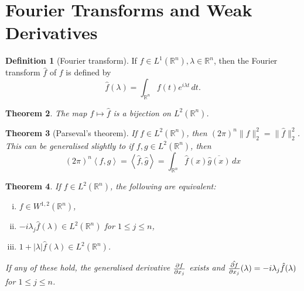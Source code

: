\documentclass[10pt, oneside, reqno]{amsart}
\theoremstyle{plain}%
\newtheorem{thm}{Theorem}[section]
\numberwithin{equation}{section}
\theoremstyle{definition}
\newtheorem{defn}[thm]{Definition}
\theoremstyle{remark}
\newcommand{\R}{\mathbb{R}}
\newcommand{\iprod}[1]{\left\langle #1 \right\rangle}
\begin{document}
\section{Fourier Transforms and Weak Derivatives} %
\label{sec:fourier_transforms_and_weak_derivatives}

\begin{defn}[Fourier transform]
	If $f \in L^1(\R^n), \lambda \in \R^n$, then the Fourier transform $\hat f$ of $f$ is defined by \begin{equation}
		\hat f(\lambda) = \int_{\R^n} f(t) e^{i \lambda t} \, dt.
	\end{equation}
\end{defn}

\begin{thm}
	The map $f \mapsto \hat f$ is a bijection on $L^2(\R^n)$. 
\end{thm}

\begin{thm}[Parseval's theorem]
	If $f \in L^2(\R^n)$, then $(2 \pi)^n \| f \|_2^2 = \| \hat f \|_2^2$.  This can be generalised slightly to if $f, g \in L^2(\R^n)$, then \[
		(2 \pi)^n \iprod{f, g} = \iprod{\hat f, \hat g} = \int_{\R^n} \hat f(x) \overline{\hat g(x)} \, dx
	\]
\end{thm}

\begin{thm}
	\label{thm:his_thm_4.1}
	If $f \in L^2(\R^n)$, the following are equivalent:
	\begin{enumerate}[(i)]
		\item $f \in W^{1, 2}(\R^n)$,
		\item $-i \lambda_j \hat f(\lambda) \in L^2(\R^n)$ for $1 \leq j \leq n$, 
		\item $1 + |\lambda| \hat f(\lambda) \in L^2(\R^n)$.  
	\end{enumerate}
	
	If any of these hold, the generalised derivative $\frac{\partial f}{\partial x_j}$ exists and $\hat{ \frac{\partial f}{\partial x_j}}(\lambda) = -i \lambda_j \hat f (\lambda)$ for $1 \leq j \leq n$.
\end{thm}
\end{document}
